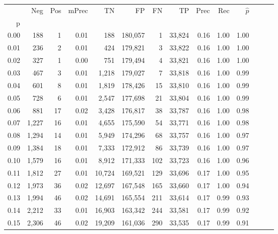 \begin{tabular}{rrrrrrrrrrrrrr}
\toprule
{} &    Neg &  Pos & mPrec &       TN &       FP &      FN &      TP &  Prec &   Rec & $\hat{p}$ \\
p    &        &      &       &          &          &         &         &       &       &           \\
\midrule
0.00 &    188 &    1 &  0.01 &      188 &  180,057 &       1 &  33,824 &  0.16 &  1.00 &      1.00 \\
0.01 &    236 &    2 &  0.01 &      424 &  179,821 &       3 &  33,822 &  0.16 &  1.00 &      1.00 \\
0.02 &    327 &    1 &  0.00 &      751 &  179,494 &       4 &  33,821 &  0.16 &  1.00 &      1.00 \\
0.03 &    467 &    3 &  0.01 &    1,218 &  179,027 &       7 &  33,818 &  0.16 &  1.00 &      0.99 \\
0.04 &    601 &    8 &  0.01 &    1,819 &  178,426 &      15 &  33,810 &  0.16 &  1.00 &      0.99 \\
0.05 &    728 &    6 &  0.01 &    2,547 &  177,698 &      21 &  33,804 &  0.16 &  1.00 &      0.99 \\
0.06 &    881 &   17 &  0.02 &    3,428 &  176,817 &      38 &  33,787 &  0.16 &  1.00 &      0.98 \\
0.07 &  1,227 &   16 &  0.01 &    4,655 &  175,590 &      54 &  33,771 &  0.16 &  1.00 &      0.98 \\
0.08 &  1,294 &   14 &  0.01 &    5,949 &  174,296 &      68 &  33,757 &  0.16 &  1.00 &      0.97 \\
0.09 &  1,384 &   18 &  0.01 &    7,333 &  172,912 &      86 &  33,739 &  0.16 &  1.00 &      0.97 \\
0.10 &  1,579 &   16 &  0.01 &    8,912 &  171,333 &     102 &  33,723 &  0.16 &  1.00 &      0.96 \\
0.11 &  1,812 &   27 &  0.01 &   10,724 &  169,521 &     129 &  33,696 &  0.17 &  1.00 &      0.95 \\
0.12 &  1,973 &   36 &  0.02 &   12,697 &  167,548 &     165 &  33,660 &  0.17 &  1.00 &      0.94 \\
0.13 &  1,994 &   46 &  0.02 &   14,691 &  165,554 &     211 &  33,614 &  0.17 &  0.99 &      0.93 \\
0.14 &  2,212 &   33 &  0.01 &   16,903 &  163,342 &     244 &  33,581 &  0.17 &  0.99 &      0.92 \\
0.15 &  2,306 &   46 &  0.02 &   19,209 &  161,036 &     290 &  33,535 &  0.17 &  0.99 &      0.91 \\

\end{tabular}
